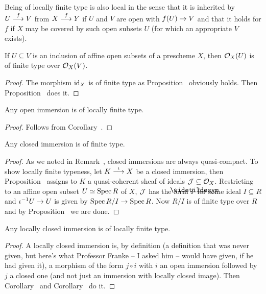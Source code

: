 \documentclass[a4paper,parskip=half,numbers=enddot, DIV=12]{scrreprt}
\begin{document}
\begin{rem*}
    Being of locally finite type is also local in the sense that it is inherited by $U\morphism[f] V$ from $X\morphism[f] Y$ if $U$ and $V$ are open with $f(U)\morphism V$ and that it holds for $f$ if $X$ may be covered by such open subsets $U$ (for which an appropriate $V$ exists).
\end{rem*}
\begin{cor}
    If $U\subseteq V$ is an inclusion of affine open subsets of a prescheme $X$, then $\mathcal{O}_X(U)$ is of finite type over $\mathcal{O}_X(V)$.
\end{cor}
\begin{proof}
	The morphism $\operatorname{id}_X$ is of finite type as Proposition~ obviously holds. Then Proposition~ does it.
\end{proof}
\begin{cor}
    Any open immersion is of locally finite type. 
\end{cor}
\begin{proof}
	Follows from Corollary~.
\end{proof}
\begin{cor}
    Any closed immersion is of finite type.
\end{cor}
\begin{proof}
	As we noted in Remark~, closed immersions are always quasi-compact. To show locally finite typeness, let $K\morphism[\iota]X$ be a closed immersion, then Proposition~ assigns to $K$ a quasi-coherent sheaf of ideals $\mathcal{J}\subseteq\mathcal{O}_X$. Restricting to an affine open subset $U\simeq\operatorname{Spec} R$ of $X$, $\mathcal{J}$ has the form $\snake I$ for some ideal $I\subseteq R$ and $\iota^{-1}U\morphism U$ is given by $\Spec R/I\morphism\Spec R$. Now $R/I$ is of finite type over $R$ and by Proposition~ we are done.
\end{proof}
\begin{cor}
    Any locally closed immersion is of locally finite type.
\end{cor}
\begin{proof}
	A locally closed immersion is, by definition (a definition that was never given, but here's what Professor Franke -- I asked him -- would have given, if he had given it), a morphism of the form $j\circ i$ with $i$ an open immersion followed by $j$ a closed one (and not just an immersion with locally closed image). Then Corollary~ and Corollary~ do it. 
\end{proof}
\end{document}
